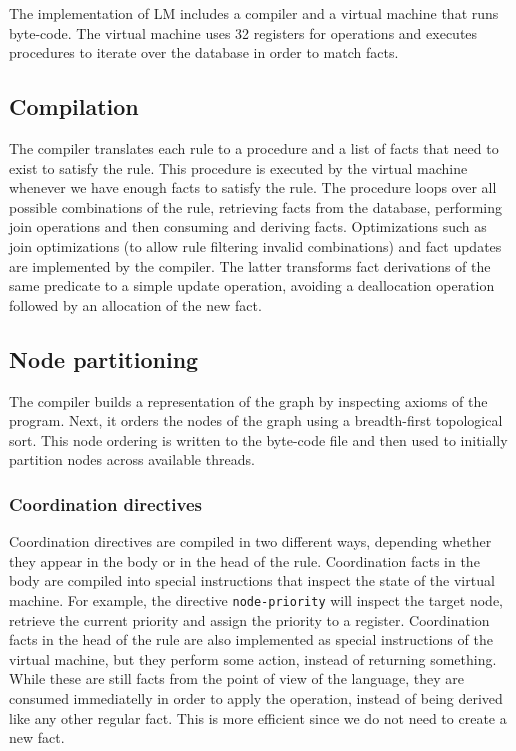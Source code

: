 The implementation of LM includes a compiler and a virtual machine that runs
byte-code. The virtual machine uses 32 registers for
operations and executes procedures to iterate over the database in order to match facts.

\subsection{Compilation}

The compiler translates each rule to a procedure and a list of facts that need
to exist to satisfy the rule. This procedure is executed by the virtual
machine whenever we have enough facts to satisfy the rule. The procedure
loops over all possible combinations of the rule, retrieving facts from the
database, performing join operations and then consuming and deriving facts.
Optimizations such as join optimizations (to allow rule filtering invalid
combinations) and fact updates are implemented by the compiler. The latter
transforms fact derivations of the same predicate to a simple update operation,
avoiding a deallocation operation followed by an allocation of the new fact.

\subsection{Node partitioning}

The compiler builds a representation of the graph by inspecting axioms of the
program. Next, it orders the nodes of the graph using a breadth-first
topological sort. This node ordering is written to the byte-code file and then
used to initially partition nodes across available threads.

\subsubsection{Coordination directives}

Coordination directives are compiled in two different ways, depending whether they
appear in the body or in the head of the rule. Coordination facts in the body
are compiled into special instructions that inspect the state of the virtual
machine. For example, the directive \texttt{node-priority} will inspect the
target node, retrieve the current priority and assign the priority to a
register. Coordination facts in the head of the rule are also implemented as
special instructions of the virtual machine, but they perform some action,
instead of returning something. While these are still facts from the point of
view of the language, they are consumed immediatelly in order to apply the
operation, instead of being derived like any other regular fact. This is more
efficient since we do not need to create a new fact.

